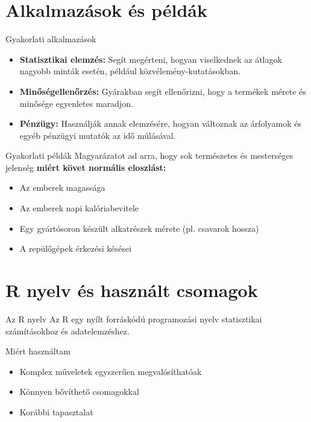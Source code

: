 \documentclass[aspectratio=169,12pt]{beamer}
\begin{document}
	\section{Alkalmazások és példák}
	\begin{frame}{Gyakorlati alkalmazások}
		\begin{itemize}
			\item \textbf{Statisztikai elemzés:} Segít megérteni, hogyan viselkednek az átlagok nagyobb minták esetén, például közvélemény-kutatásokban.
			\item \textbf{Minőségellenőrzés:} Gyárakban segít ellenőrizni, hogy a termékek mérete és minősége egyenletes maradjon.
			\item \textbf{Pénzügy:} Használják annak elemzésére, hogyan változnak az árfolyamok és egyéb pénzügyi mutatók az idő múlásával.
		\end{itemize}
	\end{frame}
	
	\begin{frame}{Gyakorlati példák}
		Magyarázatot ad arra, hogy sok természetes és mesterséges jelenség \textbf{miért követ normális eloszlást:}
		\begin{itemize}
			\item Az emberek magassága
			\item Az emberek napi kalóriabevitele
			\item Egy gyártósoron készült alkatrészek mérete (pl. csavarok hossza)
			\item A repülőgépek érkezési késései
		\end{itemize}
	\end{frame}
	
	\section{R nyelv és használt csomagok}
	\begin{frame}{Az R nyelv}
		Az R egy nyílt forráskódú programozási nyelv statisztikai számításokhoz és adatelemzéshez.
		\vfill
		\begin{block}{Miért használtam}
			\begin{itemize}
				\item Komplex műveletek egyszerűen megvalósíthatóak
				\item Könnyen bővíthető csomagokkal
				\item Korábbi tapasztalat
			\end{itemize}
		\end{block}
	\end{frame}
	
\end{document}
